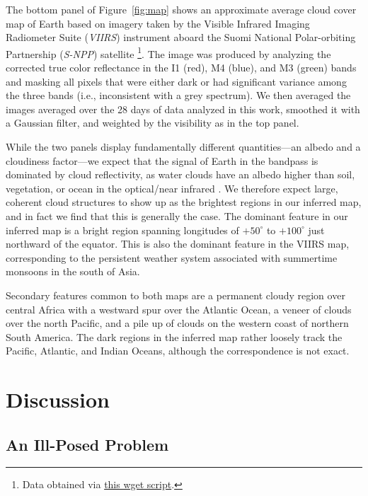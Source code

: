 \documentclass[modern]{aastex62}
\begin{document}
The bottom panel of Figure~\ref{fig:map} shows an approximate average
cloud cover map of Earth based on imagery taken by the
Visible Infrared Imaging Radiometer Suite (\emph{VIIRS}) instrument aboard the 
Suomi National Polar-orbiting Partnership (\emph{S-NPP}) satellite%
\footnote{Data obtained via 
\href{https://github.com/rodluger/earthshine/blob/master/tex/figures/viirs.sh}{this wget script}.}. 
The image was produced by analyzing the corrected true color reflectance in the
I1 (red), M4 (blue), and M3 (green) bands and masking
all pixels that were either dark or had significant variance among the three
bands (i.e., inconsistent with a grey spectrum). We then averaged the images
averaged over the 28 days of data analyzed in this work, smoothed it 
with a Gaussian filter, and weighted by the \TESS visibility as in the top panel.

While the two panels display fundamentally different quantities---an albedo
and a cloudiness factor---we expect that the signal of Earth in the \TESS
bandpass is dominated by cloud reflectivity, as water clouds have an albedo
higher than soil, vegetation, or ocean in the optical/near infrared
\citep[e.g.,][]{Jedlovec2009}. We therefore
expect large, coherent cloud structures to show up as the brightest regions 
in our inferred map, and in fact we find that this is generally the case. The
dominant feature in our inferred map is a bright region spanning longitudes
of $+50^\circ$ to $+100^\circ$ just northward of the equator. This is also the
dominant feature in the VIIRS map, corresponding to the persistent weather system
associated with summertime monsoons in the south of Asia.

Secondary features common to both maps are a permanent cloudy region over
central Africa with a westward spur over the Atlantic Ocean, a veneer of clouds
over the north Pacific, and a pile up of clouds on the western coast of
northern South America. The dark regions in the inferred map rather loosely
track the Pacific, Atlantic, and Indian Oceans, although the correspondence
is not exact.

\section{Discussion}
\label{sec:discussion}

\subsection{An Ill-Posed Problem}
\label{sec:illposed}
\end{document}
